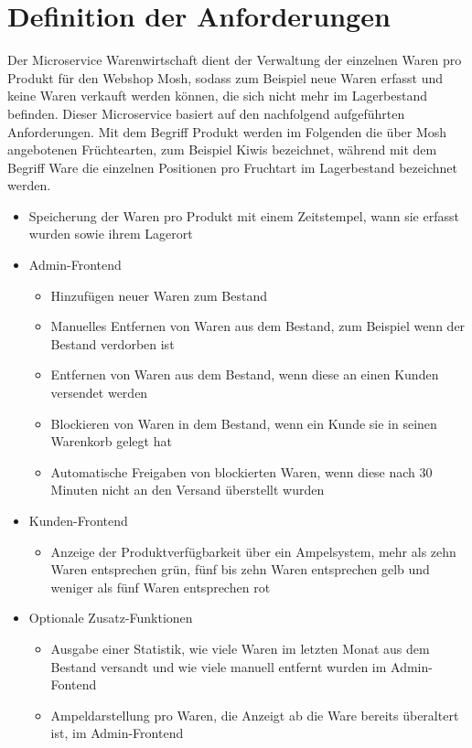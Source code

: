 \section{Definition der Anforderungen}
\label{sec: Definition der Anforderungen}

Der Microservice Warenwirtschaft dient der Verwaltung der einzelnen Waren pro Produkt für den Webshop Mosh, sodass zum Beispiel neue Waren erfasst und keine Waren verkauft werden können, die sich nicht mehr im Lagerbestand befinden. Dieser Microservice basiert auf den nachfolgend aufgeführten Anforderungen. Mit dem Begriff Produkt werden im Folgenden die über Mosh angebotenen Früchtearten, zum Beispiel Kiwis bezeichnet, während mit dem Begriff Ware die einzelnen Positionen pro Fruchtart im Lagerbestand bezeichnet werden.

\begin{itemize}
	\item Speicherung der Waren pro Produkt mit einem Zeitstempel, wann sie erfasst wurden sowie ihrem Lagerort
	\item Admin-Frontend
	\begin{itemize}
		\item Hinzufügen neuer Waren zum Bestand
		\item Manuelles Entfernen von Waren aus dem Bestand, zum Beispiel wenn der Bestand verdorben ist
		\item Entfernen von Waren aus dem Bestand, wenn diese an einen Kunden versendet werden
		\item Blockieren von Waren in dem Bestand, wenn ein Kunde sie in seinen Warenkorb gelegt hat
		\item Automatische Freigaben von blockierten Waren, wenn diese nach 30 Minuten nicht an den Versand überstellt wurden
	\end{itemize}
	\item Kunden-Frontend
	\begin{itemize}
		\item Anzeige der Produktverfügbarkeit über ein Ampelsystem, mehr als zehn Waren entsprechen grün, fünf bis zehn Waren entsprechen gelb und weniger als fünf Waren entsprechen rot 
	\end{itemize}
	\item Optionale Zusatz-Funktionen
	\begin{itemize}
		\item Ausgabe einer Statistik, wie viele Waren im letzten Monat aus dem Bestand versandt und wie viele manuell entfernt wurden im Admin-Fontend
		\item Ampeldarstellung pro Waren, die Anzeigt ab die Ware bereits überaltert ist, im Admin-Frontend
	\end{itemize}
\end{itemize}
